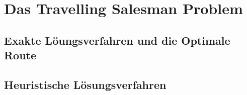 \chapter{Das Travelling Salesman Problem}
\section{Exakte Löungsverfahren und die Optimale Route}
\section{Heuristische Lösungsverfahren}